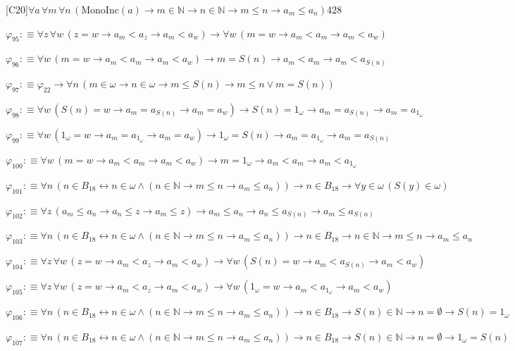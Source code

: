 \begin{fullproof}{[C20]}{$\forall a\,\forall m\,\forall n\,(\mathrm{MonoInc}(a) \to m \in \mathbb{N} \to n \in \mathbb{N} \to m \leq n \to a_{m} \leq a_{n})$}{428}
\begin{abbrevlist}
\item $\varphi_{95} :\equiv \forall z\,\forall w\,(z = w \to a_{m} < a_{z} \to a_{m} < a_{w}) \to \forall w\,(m = w \to a_{m} < a_{m} \to a_{m} < a_{w})$
\item $\varphi_{96} :\equiv \forall w\,(m = w \to a_{m} < a_{m} \to a_{m} < a_{w}) \to m = S(n) \to a_{m} < a_{m} \to a_{m} < a_{S(n)}$
\item $\varphi_{97} :\equiv \varphi_{22} \to \forall n\,(m \in \omega \to n \in \omega \to m \leq S(n) \to m \leq n \lor m = S(n))$
\item $\varphi_{98} :\equiv \forall w\,(S(n) = w \to a_{m} = a_{S(n)} \to a_{m} = a_{w}) \to S(n) = 1_{\omega} \to a_{m} = a_{S(n)} \to a_{m} = a_{1_{\omega}}$
\item $\varphi_{99} :\equiv \forall w\,(1_{\omega} = w \to a_{m} = a_{1_{\omega}} \to a_{m} = a_{w}) \to 1_{\omega} = S(n) \to a_{m} = a_{1_{\omega}} \to a_{m} = a_{S(n)}$
\item $\varphi_{100} :\equiv \forall w\,(m = w \to a_{m} < a_{m} \to a_{m} < a_{w}) \to m = 1_{\omega} \to a_{m} < a_{m} \to a_{m} < a_{1_{\omega}}$
\item $\varphi_{101} :\equiv \forall n\,(n \in B_{18} \leftrightarrow n \in \omega \land (n \in \mathbb{N} \to m \leq n \to a_{m} \leq a_{n})) \to n \in B_{18} \to \forall y \in \omega\,(S(y) \in \omega)$
\item $\varphi_{102} :\equiv \forall z\,(a_{m} \leq a_{n} \to a_{n} \leq z \to a_{m} \leq z) \to a_{m} \leq a_{n} \to a_{n} \leq a_{S(n)} \to a_{m} \leq a_{S(n)}$
\item $\varphi_{103} :\equiv \forall n\,(n \in B_{18} \leftrightarrow n \in \omega \land (n \in \mathbb{N} \to m \leq n \to a_{m} \leq a_{n})) \to n \in B_{18} \to n \in \mathbb{N} \to m \leq n \to a_{m} \leq a_{n}$
\item $\varphi_{104} :\equiv \forall z\,\forall w\,(z = w \to a_{m} < a_{z} \to a_{m} < a_{w}) \to \forall w\,(S(n) = w \to a_{m} < a_{S(n)} \to a_{m} < a_{w})$
\item $\varphi_{105} :\equiv \forall z\,\forall w\,(z = w \to a_{m} < a_{z} \to a_{m} < a_{w}) \to \forall w\,(1_{\omega} = w \to a_{m} < a_{1_{\omega}} \to a_{m} < a_{w})$
\item $\varphi_{106} :\equiv \forall n\,(n \in B_{18} \leftrightarrow n \in \omega \land (n \in \mathbb{N} \to m \leq n \to a_{m} \leq a_{n})) \to n \in B_{18} \to S(n) \in \mathbb{N} \to n = \emptyset \to S(n) = 1_{\omega}$
\item $\varphi_{107} :\equiv \forall n\,(n \in B_{18} \leftrightarrow n \in \omega \land (n \in \mathbb{N} \to m \leq n \to a_{m} \leq a_{n})) \to n \in B_{18} \to S(n) \in \mathbb{N} \to n = \emptyset \to 1_{\omega} = S(n)$

\end{abbrevlist}
\end{fullproof}
